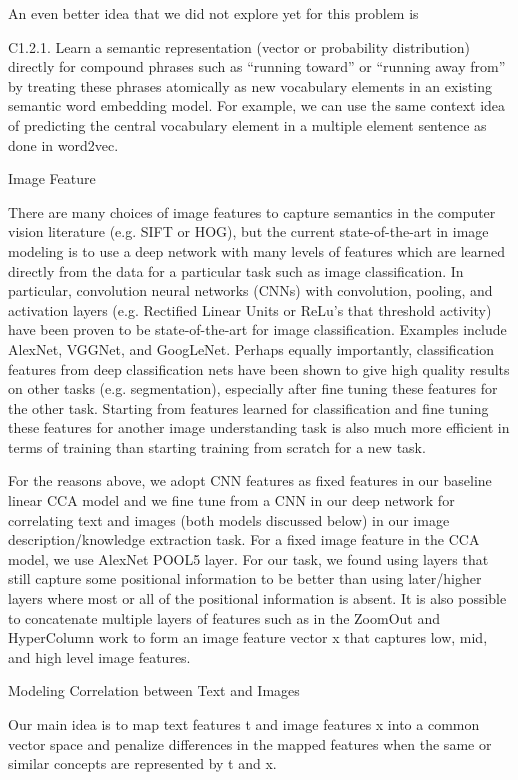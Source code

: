 \documentclass[runningheads]{llncs}
\begin{document}
An even better idea that we did not explore yet for this problem is

C1.2.1. Learn a semantic representation (vector or probability distribution) directly for compound phrases such as “running toward” or “running away from” by treating these phrases atomically as new vocabulary elements in an existing semantic word embedding model. For example, we can use the same context idea of predicting the central vocabulary element in a multiple element sentence as done in word2vec.

Image Feature

There are many choices of image features to capture semantics in the computer vision literature (e.g. SIFT or HOG), but the current state-of-the-art in image modeling is to use a deep network with many levels of features which are learned directly from the data for a particular task such as image classification. In particular, convolution neural networks (CNNs) with convolution, pooling, and activation layers (e.g. Rectified Linear Units or ReLu’s that threshold activity) have been proven to be state-of-the-art for image classification. Examples include AlexNet, VGGNet, and GoogLeNet. Perhaps equally importantly, classification features from deep classification nets have been shown to give high quality results on other tasks (e.g. segmentation), especially after fine tuning these features for the other task. Starting from features learned for classification and fine tuning these features for another image understanding task is also much more efficient in terms of training than starting training from scratch for a new task.

For the reasons above, we adopt CNN features as fixed features in our baseline linear CCA model and we fine tune from a CNN in our deep network for correlating text and images (both models discussed below) in our image description/knowledge extraction task. For a fixed image feature in the CCA model, we use AlexNet POOL5 layer. For our task, we found using layers that still capture some positional information to be better than using later/higher layers where most or all of the positional information is absent. It is also possible to concatenate multiple layers of features such as in the ZoomOut and HyperColumn work to form an image feature vector x that captures low, mid, and high level image features.

Modeling Correlation between Text and Images

Our main idea is to map text features t and image features x into a common vector space and penalize differences in the mapped features when the same or similar concepts are represented by t and x. 
\end{document}
